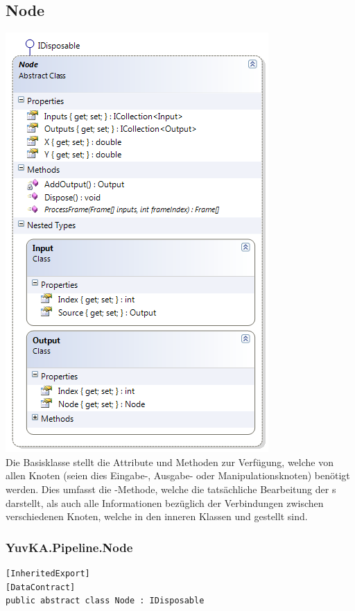 \subsection{Node}
\begin{center}\includegraphics[scale=0.7]{YuvKA.Pipeline/node.png} \\
Die Basisklasse  stellt die Attribute und Methoden zur Verfügung, welche von allen Knoten (seien dies Eingabe-, Ausgabe- oder Manipulationsknoten) benötigt werden. Dies umfasst die -Methode, welche die tatsächliche Bearbeitung der s darstellt, als auch alle Informationen bezüglich der Verbindungen zwischen verschiedenen Knoten, welche in den inneren Klassen  und  gestellt sind.
\end{center}

\subsubsection{YuvKA.Pipeline.Node}

\begin{verbatim}
[InheritedExport]
[DataContract]
public abstract class Node : IDisposable
\end{verbatim}

